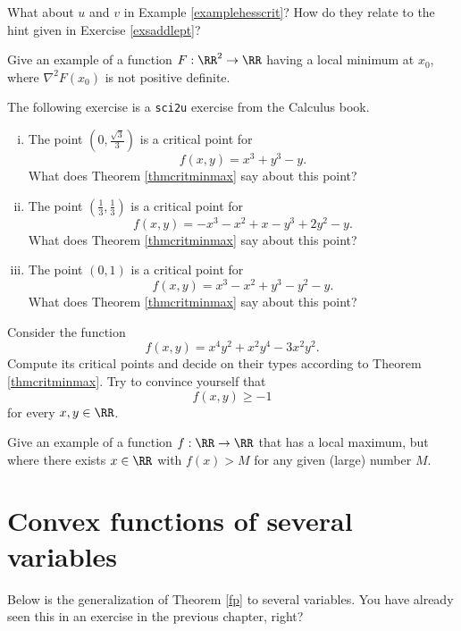 \documentclass{article}
\begin{document}
\beginshex
What about $u$ and $v$ in Example \ref{examplehesscrit}? How do they relate to the hint
given in Exercise \ref{exsaddlept}?
\endshex


\beginshex
  Give an example of a function $F:\RR^2\rightarrow \RR$ having a local minimum at
  $x_0$, where $\nabla^2 F(x_0)$ is not positive definite.
\endshex

\beginshex

The following exercise is a \texttt{sci2u} exercise from the Calculus book.

\begin{enumerate}[(i)]
\item
  The point $\left(0, \frac{\sqrt{3}}{3}\right)$ is a critical point for
  $$
  f(x, y) = x^3 + y^3 - y.
  $$
  What does Theorem \ref{thmcritminmax} say about this point?
\item
  The point $\left(\frac{1}{3}, \frac{1}{3}\right)$ is a critical point for
  $$
  f(x, y) = -x^3 -x^2 + x - y^3 + 2 y^2 - y.
  $$
  What does Theorem \ref{thmcritminmax} say about this point?
\item
  The point $(0, 1)$ is a critical point for
  $$
  f(x, y) = x^3 - x^2 + y^3 - y^2 - y.
  $$
  What does Theorem \ref{thmcritminmax} say about this point?
\end{enumerate}
\endshex
  

\beginshex
Consider the function
$$
f(x, y) = x^4 y^2 + x^2 y^4 - 3 x^2 y^2.
$$
Compute its critical points and decide on their types according to Theorem \ref{thmcritminmax}. 
Try to convince yourself that
$$
f(x, y) \geq -1
$$
for every $x, y\in \RR$.
\endshex

\beginshex
Give an example of a function $f:\RR\rightarrow \RR$ that has a local maximum, but where
there exists $x\in \RR$ with $f(x) > M$ for any given (large) number $M$.
\endshex

\section{Convex functions of several variables}

Below is the generalization of Theorem \ref{fp} to several
variables. You have already seen this in an exercise in the
previous chapter, right?
\end{document}
